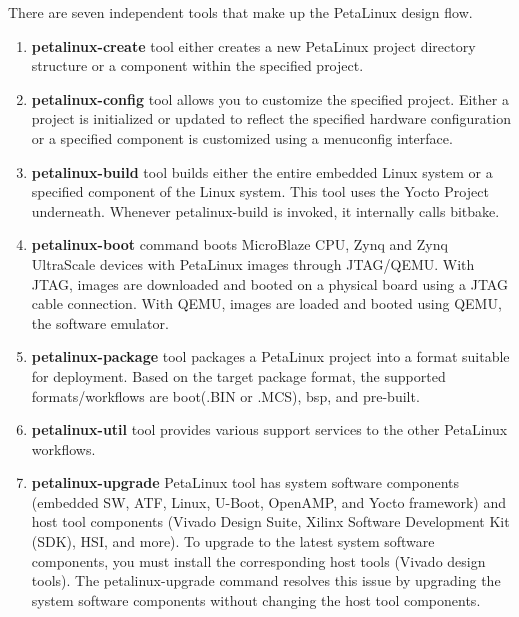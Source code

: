 \clearpage
There are seven independent tools that make up the PetaLinux design flow. 
\begin{enumerate}
  \item \textbf{petalinux-create} tool either creates a new PetaLinux project directory structure or a component within the specified project.
  \item \textbf{petalinux-config} tool allows you to customize the specified project. Either a project is initialized or updated to reflect the specified hardware configuration or a specified component is customized using a menuconfig interface.
  \item \textbf{petalinux-build} tool builds either the entire embedded Linux system or a specified component of the Linux system. This tool uses the Yocto Project underneath. Whenever petalinux-build is invoked, it internally calls bitbake.
  \item \textbf{petalinux-boot} command boots MicroBlaze CPU, Zynq and Zynq UltraScale devices with PetaLinux images through JTAG/QEMU. With JTAG, images are downloaded and booted on a physical board using a JTAG cable connection. With QEMU, images are loaded and booted using QEMU, the software emulator.
  \item \textbf{petalinux-package} tool packages a PetaLinux project into a format suitable for deployment. Based on the target package format, the supported formats/workflows are boot(.BIN or .MCS), bsp, and pre-built.
  \item \textbf{petalinux-util} tool provides various support services to the other PetaLinux workflows.
  \item \textbf{petalinux-upgrade} PetaLinux tool has system software components (embedded SW, ATF, Linux, U-Boot, OpenAMP, and Yocto framework) and host tool components (Vivado Design Suite, Xilinx Software Development Kit (SDK), HSI, and more). To upgrade to the latest system software components, you must install the corresponding host tools (Vivado design tools). The petalinux-upgrade command resolves this issue by upgrading the system software components without changing the host tool components. 
\end{enumerate}


